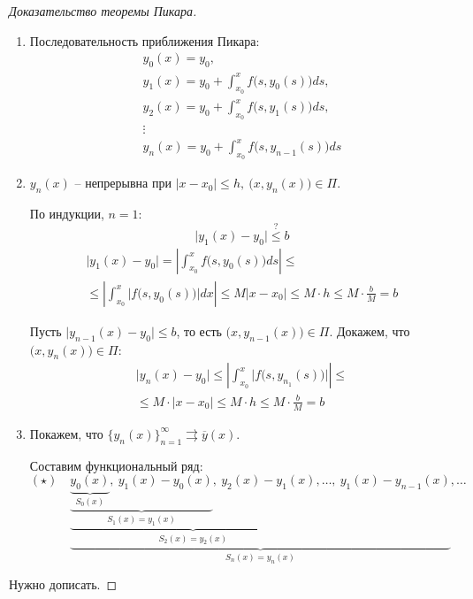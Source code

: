 \begin{proof}[Доказательство теоремы Пикара]\leavevmode
    \begin{enumerate}
        \item Последовательность приближения Пикара:
              \[
                  \begin{array}{l}
                      y_0(x) = y_0,                                       \\
                      y_1(x) = y_0 + \int_{x_0}^{x}f\big(s,y_0(s)\big)ds, \\
                      y_2(x) = y_0 + \int_{x_0}^{x}f\big(s,y_1(s)\big)ds, \\
                      \vdots                                              \\
                      y_n(x) = y_0 + \int_{x_0}^{x}f\big(s,y_{n-1}(s)\big)ds
                  \end{array}
              \]
        \item $y_n(x)$ -- непрерывна при $|x-x_0| \leqslant h, \ \big(x,y_n(x)\big)\in \Pi$.

              По индукции, $n=1$:
              \[
                  \big|y_1(x) - y_0\big| \overset{?}{\leqslant}b
              \]
              \begin{multline*}
                  \big|y_1(x) - y_0\big| = \left|\int_{x_0}^{x}f\big(s,y_0(s)\big)ds\right| \leqslant \\
                  \leqslant \left|\int_{x_0}^{x}\Big|f\big(s,y_0(s)\big)\Big|dx\right| \leqslant M|x - x_0| \leqslant M\cdot h \leqslant M\cdot \frac{b}{M} = b
              \end{multline*}

              Пусть $\big|y_{n-1}(x) - y_0\big|\leqslant b$, то есть $\big(x,y_{n-1}(x)\big)\in \Pi$. Докажем, что $\big(x,y_n(x)\big)\in\Pi$:
              \begin{multline*}
                  \big|y_n(x) - y_0\big| \leqslant \left|\int_{x_0}^{x}\Big|f\big(s,y_{n_1}(s)\big)\Big|\right|\leqslant \\
                  \leqslant M\cdot |x - x_0| \leqslant M\cdot h \leqslant M\cdot \frac{b}{M} = b
              \end{multline*}
        \item Покажем, что $\big\{y_n(x)\big\}^\infty_{n=1} \rightrightarrows \overline{y}(x)$.

              Составим функциональный ряд:
              \[
                  (\star) \quad \underbrace{\underbrace{\underbrace{\underbrace{y_0(x)}_{S_0(x)}, \ y_1(x) - y_0(x)}_{S_1(x) = y_1(x)}, \ y_2(x) - y_1(x)}_{S_2(x) = y_2(x)}, \ldots, \ y_1(x) - y_{n-1}(x)}_{S_n(x) = y_n(x)}, \ldots
              \]
    \end{enumerate}

    Нужно дописать.
\end{proof}